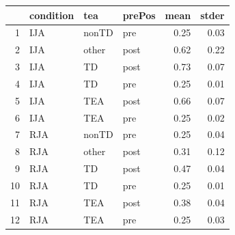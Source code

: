 \documentclass{article}
\begin{document}
\begin{figure}[H]
  \caption{}
  \noindent{}
  \centering
\end{figure}

\begin{table}[ht]
\centering
\begin{tabular}{rlllrr}
  \hline
 & condition & tea & prePos & mean & stder \\ 
  \hline
1 & IJA & nonTD & pre & 0.25 & 0.03 \\ 
  2 & IJA & other & post & 0.62 & 0.22 \\ 
  3 & IJA & TD & post & 0.73 & 0.07 \\ 
  4 & IJA & TD & pre & 0.25 & 0.01 \\ 
  5 & IJA & TEA & post & 0.66 & 0.07 \\ 
  6 & IJA & TEA & pre & 0.25 & 0.02 \\ 
  7 & RJA & nonTD & pre & 0.25 & 0.04 \\ 
  8 & RJA & other & post & 0.31 & 0.12 \\ 
  9 & RJA & TD & post & 0.47 & 0.04 \\ 
  10 & RJA & TD & pre & 0.25 & 0.01 \\ 
  11 & RJA & TEA & post & 0.38 & 0.04 \\ 
  12 & RJA & TEA & pre & 0.25 & 0.03 \\ 
   \hline
\end{tabular}
\end{table}
\end{document}
